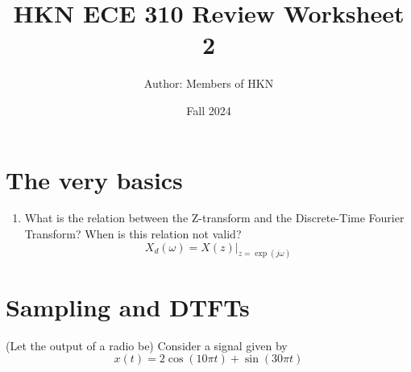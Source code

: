 \documentclass{article}
\title{HKN ECE 310 Review Worksheet 2}
\author{Author: Members of HKN }
\date{Fall 2024}
\begin{document}
\maketitle

\section{The very basics}
\begin{enumerate}
    \item What is the relation between the Z-transform and the Discrete-Time Fourier Transform? When is this relation not valid?
    $$ X_{d}(\omega) = X(z)\vert_{z=\exp(j\omega)} $$

\end{enumerate}

\section{Sampling and DTFTs}
(Let the output of a radio be) Consider a signal given by
$$
x(t) = 2\cos(10\pi t) + \sin(30\pi t)
$$
\end{document}
